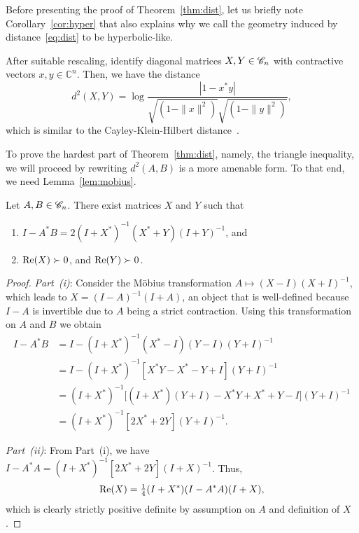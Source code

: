 \documentclass[11pt]{article}
\begin{document}
Before presenting the proof of Theorem~\ref{thm:dist}, let us briefly note Corollary~\ref{cor:hyper} that also explains why we call the geometry induced by distance~\eqref{eq:dist} to be hyperbolic-like.
\begin{cor}
  \label{cor:hyper}
  After suitable rescaling, identify diagonal matrices $X, Y \in \mathscr{C}_n$ with contractive vectors $x, y \in \mathbb{C}^n$. Then, we have the distance
  \begin{equation*}
    d^2(X,Y) = \log \frac{|1-x^*y|}{\sqrt{(1-\|x\|^2)}\sqrt{(1-\|y\|^2)}},
  \end{equation*}
  which is similar to the Cayley-Klein-Hilbert distance~\citep[pg.~120]{deza2013}.
\end{cor}

To prove the hardest part of Theorem~\ref{thm:dist}, namely, the triangle inequality, we will proceed by rewriting $d^2(A,B)$ is a more amenable form. To that end, we need Lemma~\ref{lem:mobius}.
\begin{lemma}[M\"obius]
  \label{lem:mobius}
  Let $A, B \in \mathscr{C}_n$. There exist matrices $X$ and $Y$ such that
  \begin{enumerate}
  \item $I-A^*B = 2(I+X^*)^{-1}(X^*+Y)(I+Y)^{-1}$, and 
  \item $\operatorname{Re}(X) \succ 0$, and $\operatorname{Re}(Y) \succ 0$.
  \end{enumerate}
\end{lemma}
\begin{proof}
  \emph{Part~(i)}: Consider the M\"obius transformation $A \mapsto (X-I)(X+I)^{-1}$, which leads to $X=(I-A)^{-1}(I+A)$, an object that is well-defined because $I-A$ is invertible due to $A$ being a strict contraction. Using this transformation on $A$ and $B$ we obtain
  \begin{align*}
    I-A^*B &= I - (I+X^*)^{-1}(X^*-I)(Y-I)(Y+I)^{-1}\\
    &= I - (I+X^*)^{-1}[X^*Y-X^*-Y+I](Y+I)^{-1}\\
    &= (I+X^*)^{-1}\bigl[(I+X^*)(Y+I) - X^*Y+X^*+Y-I\bigr](Y+I)^{-1}\\
    &= (I+X^*)^{-1}[2X^*+2Y](Y+I)^{-1}.
  \end{align*}

  \noindent\emph{Part~(ii)}: From Part~(i), we have $I-A^*A=(I+X^*)^{-1}[2X^*+2Y](I+X)^{-1}$. Thus,
  \begin{equation*}
    \operatorname{Re}(X) = \tfrac14(I+X^*)(I-A^*A)(I+X),
  \end{equation*}
  which is clearly strictly positive definite by assumption on $A$ and definition of $X$.
\end{proof}
\end{document}
